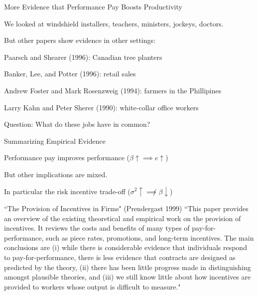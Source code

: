 \documentclass[aspectratio=169,usenames,dvipsnames]{beamer}
\newenvironment{wideitemize}{\itemize\addtolength{\itemsep}{10pt}}{\enditemize}
\begin{document}
\begin{frame}{More Evidence that Performance Pay Boosts Productivity}
\begin{wideitemize}
    \item We looked at windshield installers, teachers, ministers, jockeys, doctors.
    \pause
    \item But other papers show evidence in other settings:
        \begin{wideitemize}
        \item Paarsch and Shearer (1996): Canadian tree planters
        \item Banker, Lee, and Potter (1996): retail sales
        \item Andrew Foster and Mark Rosenzweig (1994): farmers in the Phillipines
        \item  Larry Kahn and Peter Sherer (1990): white-collar office workers
        \item Question: What do these jobs have in common?
    \end{wideitemize}
\end{wideitemize}

\end{frame}


\begin{frame}{Summarizing Empirical Evidence}
\begin{wideitemize}
    \item Performance pay improves performance ($\beta\uparrow \implies e \uparrow$)
    \item But other implications are mixed.
    \item In particular the risk incentive trade-off ($\sigma^2 \uparrow \not \implies \beta \downarrow$)
\end{wideitemize}

\pause
\begin{block}{``The Provision of Incentives in Firms" (Prendergast 1999) }
    ``This paper provides an overview of the existing theoretical and empirical work on the provision of incentives. It reviews the costs and benefits of many types of pay-for-performance, such as piece rates, promotions, and long-term incentives. The main conclusions are (i) while there is considerable evidence that individuals respond to pay-for-performance, there is less evidence that contracts are designed as predicted by the theory, (ii) there has been little progress made in distinguishing amongst plausible theories, and (iii) we still know little about how incentives are provided to workers whose output is difficult to measure."
\end{block}
    
\end{frame}
\end{document}
